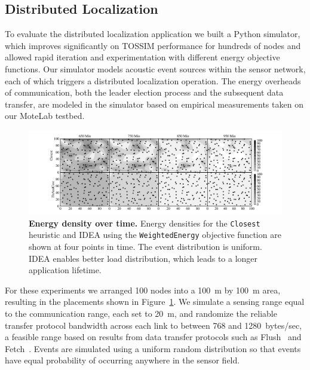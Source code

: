 \subsection{Distributed Localization}

To evaluate the distributed localization application we built a Python
simulator, which improves significantly on TOSSIM performance for hundreds of
nodes and allowed rapid iteration and experimentation with different energy
objective functions. Our simulator models acoustic event sources within the
sensor network, each of which triggers a distributed localization operation.
The energy overheads of communication, both the leader election process and
the subsequent data transfer, are modeled in the simulator based on empirical
measurements taken on our MoteLab testbed.

\begin{figure}[t]
\begin{center}
\includegraphics[width=\hsize]{./5-idea/figs/localizationdensityvtime.pdf}
\end{center}

\caption{\textbf{Energy density over time.} Energy densities for the
\texttt{Closest} heuristic and IDEA using the \texttt{WeightedEnergy}
objective function are shown at four points in time. The event distribution
is uniform. IDEA enables better load distribution, which leads to a longer
application lifetime.}

\label{idea-fig-localizationdensityvtime}
\end{figure}

For these experiments we arranged 100 nodes into a 100~m by 100~m area,
resulting in the placements shown in
Figure~\ref{idea-fig-localizationdensityvtime}. We simulate a sensing range
equal to the communication range, each set to 20~m, and randomize the
reliable transfer protocol bandwidth across each link to between 768 and
1280~bytes/sec, a feasible range based on results from data transfer
protocols such as Flush~\cite{flush-sensys07} and
Fetch~\cite{volcano-osdi06}. Events are simulated using a uniform random
distribution so that events have equal probability of occurring anywhere in
the sensor field.

